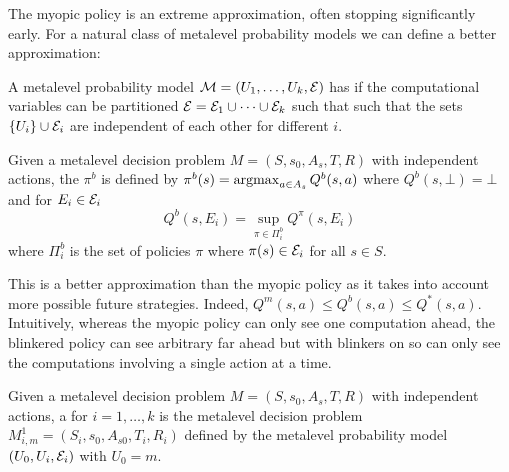 

The myopic policy is an extreme approximation, often stopping significantly early.
For a natural class of metalevel probability models we can define a better approximation:

\begin{dfn}\label{dfn:independent-actions}
	A metalevel probability model $\mathcal{M}=(U_1,\dots,U_k,\mathcal{E})$ 
	has  if the computational variables can be partitioned 
	$\mathcal{E} = \mathcal{E}_1\cup\dots\cup\mathcal{E}_k$ such that such that
	the sets $\{U_i\}\cup\mathcal{E}_i$ are independent of each other for different $i$.	
\end{dfn}

\begin{dfn}\label{dfn:blinkered}
	Given a metalevel decision problem $M=(S,s_0,A_s,T,R)$ with independent actions,
	the  $\pi^b$ is defined by $\pi^b(s) = \operatorname*{argmax}_{a\in A_s} Q^b(s,a)$ where
	$Q^b(s,\bot) = \bot$ and for $E_i\in\mathcal{E}_i$
	\begin{equation}\label{eq:blinkered}
		Q^b(s,E_i) = \sup_{\pi\in\Pi^b_i} Q^\pi(s,E_i)
	\end{equation}
	where $\Pi^b_i$ is the set of policies $\pi$ where $\pi(s)\in\mathcal{E}_i$ for all $s\in S$.
\end{dfn}

This is a better approximation than the myopic policy as it takes into account more possible future strategies.
Indeed, $Q^m(s,a) \le Q^b(s,a) \le Q^*(s,a)$.  Intuitively, whereas the myopic policy can only see one 
computation ahead, the blinkered policy can see arbitrary far ahead but with blinkers on so can only see
the computations involving a single action at a time.



\begin{dfn}\label{dfn:one-action}
	Given a metalevel decision problem $M=(S,s_0,A_s,T,R)$ with independent actions,
	a  for $i=1,\dots,k$ is the metalevel decision
	problem $M^1_{i,m} = (S_i,s_0,A_{s0},T_i,R_i)$ defined by the metalevel probability
	model $(U_0,U_i,\mathcal{E}_i)$ with $U_0=m$.
\end{dfn}

